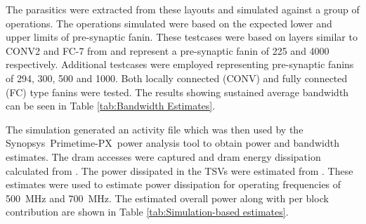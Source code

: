 \documentclass[journal]{IEEEtran}
\begin{document}
The parasitics were extracted from these layouts and simulated against a group of operations. 
The operations simulated were based on the expected lower and upper limits of pre-synaptic fanin. 
These testcases were based on layers similar to CONV2 and FC-7 from \cite{krizhevsky2012imagenet} and represent a pre-synaptic fanin of 225 and 4000 respectively.
Additional testcases were employed representing pre-synaptic fanins of 294, 300, 500 and 1000. Both locally connected (CONV) and fully connected (FC) type fanins were tested.
The results showing sustained average bandwidth can be seen in Table \ref{tab:Bandwidth Estimates}.

The simulation generated an activity file which was then used by the Synopsys\textregistered ~Primetime-PX\texttrademark ~power analysis tool to obtain power and bandwidth estimates.
The \ac{dram} accesses were captured and \ac{dram} energy dissipation calculated from \cite{tezzaron:diram4}. The power dissipated in the TSVs were estimated from \cite{liu2012compact}.
These estimates were used to estimate power dissipation for operating frequencies of \SI{500}{\mega\hertz} and \SI{700}{\mega\hertz}.
The estimated overall power along with per block contribution are shown in Table \ref{tab:Simulation-based estimates}.
\end{document}
